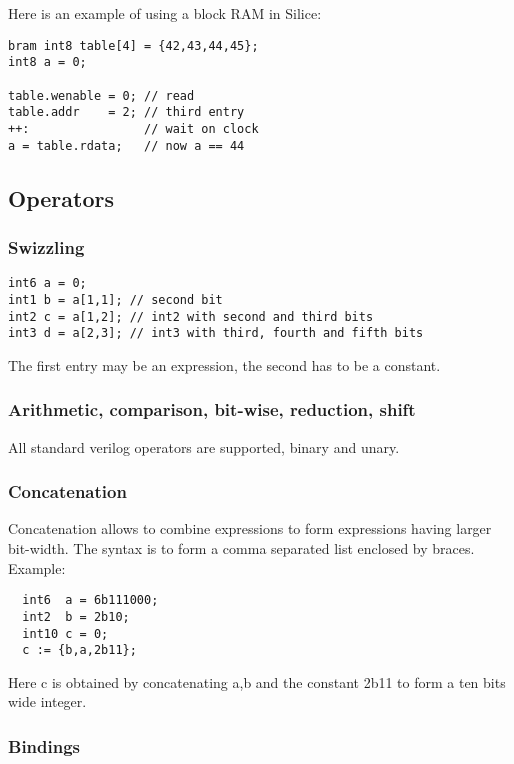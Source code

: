 \documentclass[a4]{article}
\newcommand\silice{Silice}
\begin{document}
Here is an example of using a block RAM in \silice{}:

\begin{verbatim}
bram int8 table[4] = {42,43,44,45};
int8 a = 0;

table.wenable = 0; // read
table.addr    = 2; // third entry
++:                // wait on clock
a = table.rdata;   // now a == 44
\end{verbatim}


\subsection{Operators}

\subsubsection{Swizzling}

\begin{verbatim}
int6 a = 0;
int1 b = a[1,1]; // second bit
int2 c = a[1,2]; // int2 with second and third bits
int3 d = a[2,3]; // int3 with third, fourth and fifth bits
\end{verbatim}

The first entry may be an expression, the second has to be a constant.

\subsubsection{Arithmetic, comparison, bit-wise, reduction, shift}

All standard verilog operators are supported, binary and unary.

\subsubsection{Concatenation}

Concatenation allows to combine expressions to form expressions having larger bit-width.
The syntax is to form a comma separated list enclosed by braces.  Example:
\begin{verbatim}
  int6  a = 6b111000;
  int2  b = 2b10;
  int10 c = 0;
  c := {b,a,2b11};
\end{verbatim}

Here c is obtained by concatenating a,b and the constant 2b11 to form a ten bits wide integer.

\subsubsection{Bindings}
\label{sec:bindings}
\end{document}
